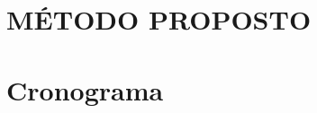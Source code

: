 \documentclass[
	12pt,				%
  oneside,
	a4paper,			%
	chapter=TITLE,		%
	english,			%
	brazil				%
	]{abntex2}
\begin{document}
\chapter{MÉTODO PROPOSTO}



% 
%

\chapter{Cronograma}


%





\printindex
\end{document}
